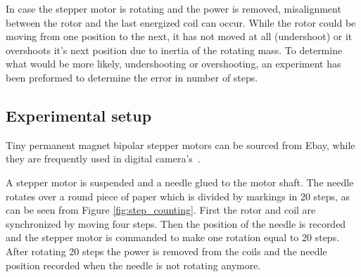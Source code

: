 In case the stepper motor is rotating and the power is removed, misalignment between the rotor and the last energized coil can occur.
While the rotor could be moving from one position to the next, it has not moved at all (undershoot) or it overshoots it's next position due to inertia of the rotating mass. 
To determine what would be more likely, undershooting or overshooting, an experiment has been preformed to determine the error in number of steps.

\subsection{Experimental setup}

Tiny permanent magnet bipolar stepper motors can be sourced from Ebay, while they are frequently used in digital camera's~\cite{nidec_stepper_2017}.

A stepper motor is suspended and a needle glued to the motor shaft.
The needle rotates over a round piece of paper which is divided by markings in 20 steps, as can be seen from Figure \ref{fig:step_counting}.
First the rotor and coil are synchronized by moving four steps.
Then the position of the needle is recorded and the stepper motor is commanded to make one rotation equal to 20 steps.
After rotating 20 steps the power is removed from the coils and the needle position recorded when the needle is not rotating anymore.

